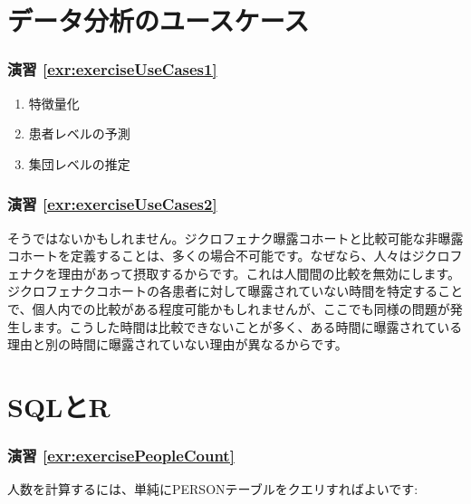 \documentclass[
  11pt]{book}
\theoremstyle{definition}
\theoremstyle{definition}
\theoremstyle{definition}
\theoremstyle{definition}
\theoremstyle{remark}
\begin{document}
\section{データ分析のユースケース}\label{UseCasesanswers}

\subsubsection*{演習 \ref{exr:exerciseUseCases1}}\label{ux6f14ux7fd2-refexrexerciseusecases1}

\begin{enumerate}
\def\labelenumi{\arabic{enumi}.}
\item
  特徴量化
\item
  患者レベルの予測
\item
  集団レベルの推定
\end{enumerate}

\subsubsection*{演習 \ref{exr:exerciseUseCases2}}\label{ux6f14ux7fd2-refexrexerciseusecases2}

そうではないかもしれません。ジクロフェナク曝露コホートと比較可能な非曝露コホートを定義することは、多くの場合不可能です。なぜなら、人々はジクロフェナクを理由があって摂取するからです。これは人間間の比較を無効にします。ジクロフェナクコホートの各患者に対して曝露されていない時間を特定することで、個人内での比較がある程度可能かもしれませんが、ここでも同様の問題が発生します。こうした時間は比較できないことが多く、ある時間に曝露されている理由と別の時間に曝露されていない理由が異なるからです。

\section{SQLとR}\label{SqlAndRanswers}

\subsubsection*{演習 \ref{exr:exercisePeopleCount}}\label{ux6f14ux7fd2-refexrexercisepeoplecount}

人数を計算するには、単純にPERSONテーブルをクエリすればよいです:
\end{document}
